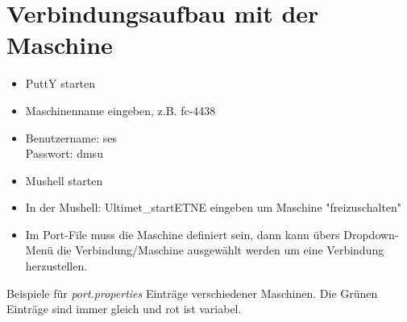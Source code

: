 \section{Verbindungsaufbau mit der Maschine}
	\begin{itemize}
		\item PuttY starten
		\item Maschinenname eingeben, z.B. fc-4438
		\item Benutzername: ses\\
	  Passwort: dmsu
		\item Mushell starten
		\item In der Mushell: Ultimet\_startETNE eingeben um Maschine "freizuschalten"
		\item Im Port-File muss die Maschine definiert sein, dann kann übers Dropdown-Menü die Verbindung/Maschine ausgewählt werden um eine Verbindung herzustellen.
	\end{itemize}
	Beispiele für \textit{port.properties} Einträge verschiedener Maschinen. Die Grünen Einträge sind immer gleich und rot ist variabel.
